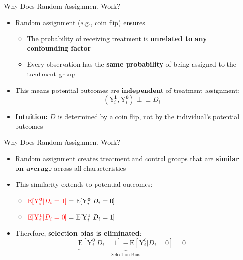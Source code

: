 \documentclass[hyperref={pdfpagelabels=false}]{beamer}
\newcommand{\indep}{\perp\!\!\!\perp}
\begin{document}
	\begin{frame}{Why Does Random Assignment Work?}
		\begin{itemize}
			\item Random assignment (e.g., coin flip) ensures:
			\vspace{0.2cm}
			\begin{itemize}
				\item The probability of receiving treatment is \textbf{unrelated to any confounding factor}
				\vspace{0.2cm}
				\item Every observation has the \textbf{same probability} of being assigned to the treatment group
			\end{itemize}
			\vspace{0.3cm}
			\item This means potential outcomes are \textbf{independent} of treatment assignment:
			\begin{equation*}
				(\mathrm{Y}^{\mathbf{1}}_{i},\mathrm{Y}^{\mathbf{0}}_{i}) \indep D_{i}
			\end{equation*}
			\item \textbf{Intuition:} $D$ is determined by a coin flip, not by the individual's potential outcomes
		\end{itemize}
	\end{frame}
	
	\begin{frame}{Why Does Random Assignment Work?}
		\begin{itemize}
			\item Random assignment creates treatment and control groups that are \textbf{similar on average} across all characteristics
			\vspace{0.2cm}
			\item This similarity extends to potential outcomes:
			\vspace{0.1cm}
			\begin{itemize}
				\item $\textcolor{red}{\mathrm{E}[\mathrm{Y}^{\mathbf{0}}_{i}|D_i=1]} = \mathrm{E}[\mathrm{Y}^{\mathbf{0}}_{i}|D_i=0]$
				\vspace{0.2cm}
				\item $\textcolor{red}{\mathrm{E}[\mathrm{Y}^{\mathbf{1}}_{i}|D_i=0]} = \mathrm{E}[\mathrm{Y}^{\mathbf{1}}_{i}|D_i=1]$
			\end{itemize}
			\vspace{0.3cm}
			\item Therefore, \textbf{selection bias is eliminated}:
			\begin{equation*}
				\underbrace{\mathrm{E}[\mathrm{Y}^{0}_{i}|D_i=1]-\mathrm{E}[\mathrm{Y}^{0}_{i}|D_i=0]}_{\text{Selection Bias}} = 0
			\end{equation*}
		\end{itemize}
	\end{frame}
	
\end{document}
